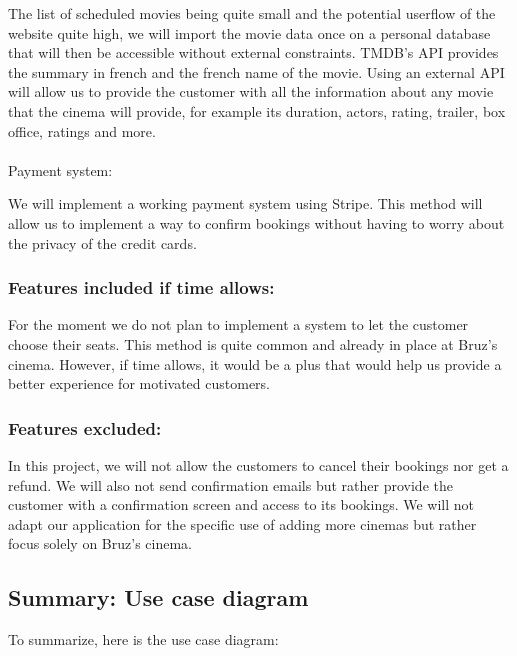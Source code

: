 \documentclass[
  french,
  11pt,
  a4paper,
]{article}
\makeatletter
\let\oldparagraph\paragraph
\renewcommand{\paragraph}{
    \@ifstar
      \xxxParagraphStar
      \xxxParagraphNoStar
  }
\newcommand{\xxxParagraphStar}[1]{\oldparagraph*{#1}\mbox{}}
\newcommand{\xxxParagraphNoStar}[1]{\oldparagraph{#1}\mbox{}}
\makeatother
\begin{document}
The list of scheduled movies being quite small and the potential
userflow of the website quite high, we will import the movie data once
on a personal database that will then be accessible without external
constraints. TMDB's API provides the summary in french and the french
name of the movie. Using an external API will allow us to provide the
customer with all the information about any movie that the cinema will
provide, for example its duration, actors, rating, trailer, box office,
ratings and more.

\paragraph{Payment system:}\label{payment-system}

We will implement a working payment system using Stripe. This method
will allow us to implement a way to confirm bookings without having to
worry about the privacy of the credit cards.

\subsubsection{Features included if time
allows:}\label{features-included-if-time-allows}

For the moment we do not plan to implement a system to let the customer
choose their seats. This method is quite common and already in place at
Bruz's cinema. However, if time allows, it would be a plus that would
help us provide a better experience for motivated customers.

\subsubsection{Features excluded:}\label{features-excluded}

In this project, we will not allow the customers to cancel their
bookings nor get a refund. We will also not send confirmation emails but
rather provide the customer with a confirmation screen and access to its
bookings. We will not adapt our application for the specific use of
adding more cinemas but rather focus solely on Bruz's cinema.

\subsection{Summary: Use case diagram}\label{summary-use-case-diagram}

To summarize, here is the use case diagram:
\end{document}
